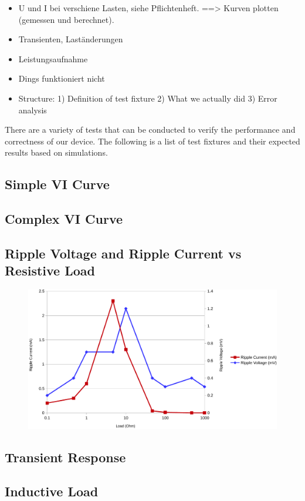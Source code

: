 \begin{itemize}
    \item
        U und I bei verschiene Lasten, siehe Pflichtenheft.
            ==> Kurven plotten (gemessen und berechnet).
    \item
        Transienten, Laständerungen
    \item
        Leistungsaufnahme
    \item
        Dings funktioniert nicht
    \item
        Structure:
            1) Definition of test fixture
            2) What we actually did
            3) Error analysis
\end{itemize}


There are a variety of tests that can be conducted to verify the performance and
correctness of our  device.  The  following is a list of test fixtures and their
expected results based on simulations.

\subsection{Simple VI Curve}


\subsection{Complex VI Curve}


\subsection{Ripple Voltage and Ripple Current vs Resistive Load}

\begin{figure}[th!]
    \centering
    \includegraphics[width=.7\textwidth]{images/sim/ripple-vs-load.pdf}
    \caption{}
\end{figure}


\subsection{Transient Response}


\subsection{Inductive Load}


